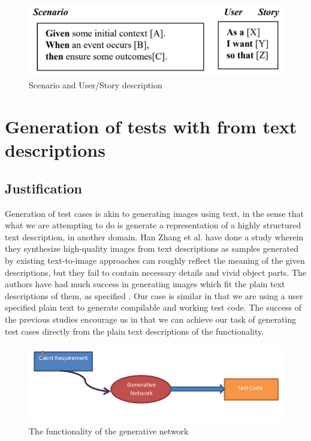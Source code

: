 \documentclass[conference, onecolumn, a4, 12pt]{IEEEtran}
\begin{document}
\begin{figure}
	\centering
	\includegraphics[width=0.7\linewidth]{scenario_user_story}
	\caption{Scenario and User/Story description}
	\label{fig:scenariouserstory}
\end{figure}


\section{Generation of tests with from text descriptions}
\subsection{Justification}
Generation of test cases is akin to generating images using text, in the sense that what we are attempting to do is generate a representation of a highly structured text description, in another domain. Han Zhang et al. have done a study wherein they synthesize high-quality images from text descriptions as samples generated by existing text-to-image approaches can roughly reflect the meaning of the given descriptions, but they fail to contain necessary details and vivid object parts. The authors have had much success in generating images which fit the plain text descriptions of them, as specified \cite{b5}. Our case is similar in that we are using a user specified plain text to generate compilable and working test code. The success of the previous studies encourage us in that we can achieve our task of generating test cases directly from the plain text descriptions of the functionality.

\begin{figure}
	\includegraphics[width=\linewidth]{Generative_network.png}
	\caption{The functionality of the generative network}
	\label{fig2}
\end{figure}
\end{document}
